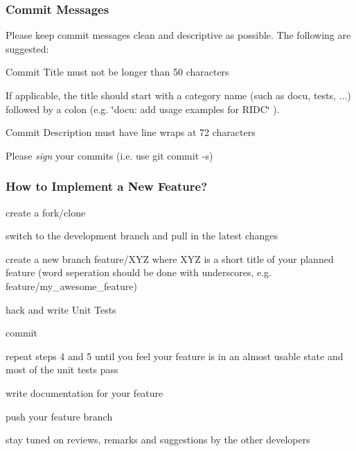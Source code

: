 \subsubsection*{Commit Messages}

Please keep commit messages clean and descriptive as possible. The following are suggested\+:


\begin{DoxyItemize}
\item Commit Title must not be longer than 50 characters

If applicable, the title should start with a category name (such as {\ttfamily docu}, {\ttfamily tests}, ...) followed by a colon (e.\+g. {\ttfamily \char`\"{}docu\+: add usage
  examples for R\+I\+D\+C\char`\"{}} ).
\item Commit Description must have line wraps at 72 characters
\item Please {\itshape sign} your commits (i.\+e. use {\ttfamily git commit -\/s})
\end{DoxyItemize}

\subsubsection*{How to Implement a New Feature?}


\begin{DoxyEnumerate}
\item create a fork/clone
\item switch to the {\ttfamily development} branch and pull in the latest changes
\item create a new branch {\ttfamily feature/\+X\+Y\+Z} where {\ttfamily X\+Y\+Z} is a short title of your planned feature (word seperation should be done with underscores, e.\+g. {\ttfamily feature/my\+\_\+awesome\+\_\+feature})
\item hack and write Unit Tests
\item commit
\item repeat steps 4 and 5 until you feel your feature is in an almost usable state and most of the unit tests pass
\item write documentation for your feature
\item push your feature branch
\item stay tuned on reviews, remarks and suggestions by the other developers 
\end{DoxyEnumerate}